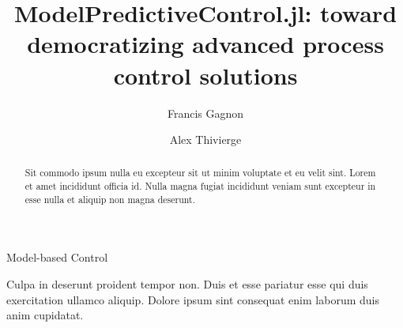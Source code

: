 \documentclass{ifacconf}
\begin{document}
\begin{frontmatter}

\title{ModelPredictiveControl.jl: toward democratizing advanced process control solutions}

\author[First]{Francis Gagnon} 
\author[First]{Alex Thivierge} 

\address[First]{Process Observation and Optimization Laboratory (LOOP), Université Laval, Quebec City, G1V 0A6, Canada}
\address[Second]{Process Monitoring Automation and Control group (PMAC), Pfizer Canada ULC, Montreal, H9J 2M5, Canada}

\begin{abstract} 
Sit commodo ipsum nulla eu excepteur sit ut minim voluptate et eu velit sint. Lorem et amet incididunt officia id. Nulla magna fugiat incididunt veniam sunt excepteur in esse nulla et aliquip non magna deserunt.
\end{abstract}

\begin{keyword}
Model-based Control
\end{keyword}

\end{frontmatter}






\begin{ack}
Culpa in deserunt proident tempor non. Duis et esse pariatur esse qui duis exercitation ullamco aliquip. Dolore ipsum sint consequat enim laborum duis anim cupidatat.
\end{ack}


\end{document}
